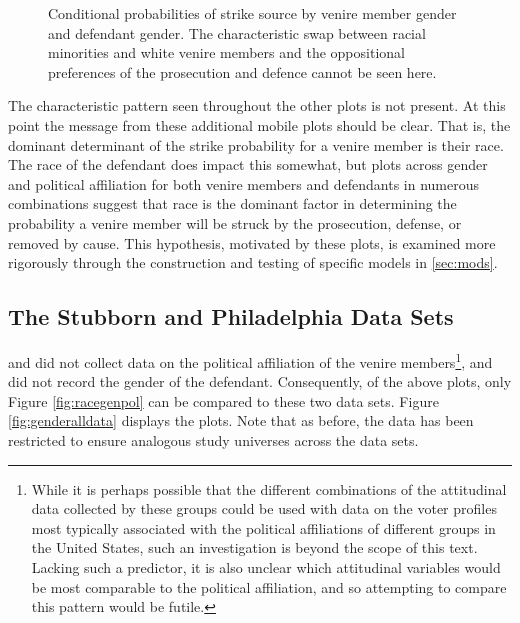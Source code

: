 \begin{figure}[h!]
  \centering
  \caption[Strike Source by Race and Gender (Sunshine)]
  {\footnotesize Conditional probabilities of strike source by venire member gender and defendant gender. The characteristic swap
    between racial minorities and white venire members and the oppositional preferences of the prosecution and defence cannot be
    seen here.} \label{fig:gengen}
\end{figure}

The characteristic pattern seen throughout the other plots is not present. At this point the message from these additional mobile
plots should be clear. That is, the dominant determinant of the strike probability for a venire member is their race. The race of
the defendant does impact this somewhat, but plots across gender and political affiliation for both venire members and defendants
in numerous combinations suggest that race is the dominant factor in determining the probability a venire member will be struck by
the prosecution, defense, or removed by cause. This hypothesis, motivated by these plots, is examined more rigorously through the
construction and testing of specific models in \ref{sec:mods}.

\subsection{The Stubborn and Philadelphia Data Sets}

\cite{StubbornLegacy} and \cite{PerempChalMurder} did not collect data on the political affiliation of the venire
members\footnote{While it is perhaps possible that the different combinations of the attitudinal data collected by these groups
  could be used with data on the voter profiles most typically associated with the political affiliations of different groups in
  the United States, such an investigation is beyond the scope of this text. Lacking such a predictor, it is also unclear which
  attitudinal variables would be most comparable to the political affiliation, and so attempting to compare this pattern would be
  futile.}, and \cite{StubbornLegacy} did not record the gender of the defendant. Consequently, of the above plots, only Figure
\ref{fig:racegenpol} can be compared to these two data sets. Figure \ref{fig:genderalldata} displays the plots. Note that as
before, the data has been restricted to ensure analogous study universes across the data sets.

